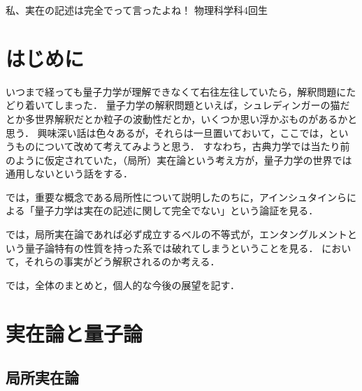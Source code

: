 \documentclass[uplatex,dvipdfmx,10pt,b5paper,papersize]{jsbook}
\begin{document}

\renewcommand\textcolor[2]{#2} %

\newif\ifsecI
\newif\ifsecII

\secItrue
\secIItrue

\kaishititle%
  {私、実在の記述は完全でって言ったよね！}%
  {物理科学科4回生}%
  {}%

\section*{はじめに}
いつまで経っても量子力学が理解できなくて右往左往していたら，解釈問題にたどり着いてしまった．
量子力学の解釈問題といえば，シュレディンガーの猫だとか多世界解釈だとか粒子の波動性だとか，いくつか思い浮かぶものがあるかと思う．
興味深い話は色々あるが，それらは一旦置いておいて，ここでは，というものについて改めて考えてみようと思う．
すなわち，古典力学では当たり前のように仮定されていた，（局所）実在論という考え方が，量子力学の世界では通用しないという話をする．\par
{}では，重要な概念である局所性について説明したのちに，アインシュタインらによる「量子力学は実在の記述に関して完全でない」という論証を見る．\par
{}では，局所実在論であれば必ず成立するベルの不等式が，エンタングルメントという量子論特有の性質を持った系では破れてしまうということを見る．
において，それらの事実がどう解釈されるのか考える．\par
{}では，全体のまとめと，個人的な今後の展望を記す．\par



\ifsecI
\section{実在論と量子論}\label{sec:1}

%
\subsection{局所実在論} %
\end{document}
